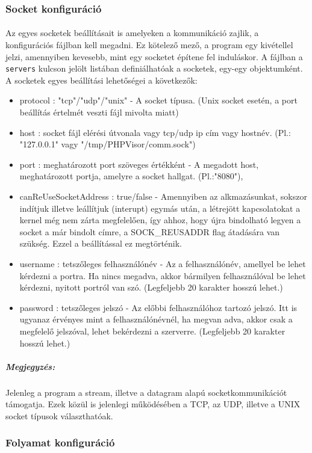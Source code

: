 \documentclass[12pt]{report}
\begin{document}
  \subsubsection{Socket konfiguráció}
  \paragraph{} 
  Az egyes socketek beállításait is amelyeken a kommunikáció zajlik, a konfigurációs fájlban kell megadni. Ez kötelező mező, a program egy kivétellel jelzi, amennyiben kevesebb, mint egy socketet építene fel induláskor. A fájlban a \verb|servers| kulcson jelölt listában definiálhatóak a socketek, egy-egy objektumként. A socketek egyes beállítási lehetőségei a következők:
  \begin{itemize}
  \item protocol : "tcp"/"udp"/"unix" - A socket típusa. (Unix socket esetén, a port beállítás értelmét veszti fájl mivolta miatt)
  \item host : socket fájl elérési útvonala vagy tcp/udp ip cím vagy hostnév. (Pl.: "127.0.0.1" vagy "/tmp/PHPVisor/comm.sock")
  \item port : meghatározott port szöveges értékként - A megadott host, meghatározott portja, amelyre a socket hallgat. (Pl.:"8080"),
  \item canReUseSocketAddress : true/false - Amennyiben az alkmazásunkat, sokszor indítjuk illetve leállítjuk (interupt) egymás után, a létrejött kapcsolatokat a kernel még nem zárta megfelelően, így ahhoz, hogy újra bindolható legyen a socket a már bindolt címre, a SOCK\_REUSADDR flag átadására van szükség. Ezzel a beállítással ez megtörténik.
  \item username : tetszőleges felhasználónév - Az a felhasználónév, amellyel be lehet kérdezni a portra. Ha nincs megadva, akkor bármilyen felhasználóval be lehet kérdezni, nyitott portról van szó. (Legfeljebb 20 karakter hosszú lehet.)
  \item password : tetszőleges jelszó - Az előbbi felhasználóhoz tartozó jelszó. Itt is ugyanaz érvényes mint a felhasználónévnél, ha megvan adva, akkor csak a megfelelő jelszóval, lehet bekérdezni a szerverre. (Legfeljebb 20 karakter hosszú lehet.)
  \end{itemize}
  \subparagraph{Megjegyzés:}
  Jelenleg a program a stream, illetve a datagram alapú socketkommunikációt támogatja. Ezek közül is jelenlegi működésében a TCP, az UDP, illetve a UNIX socket típusok választhatóak.
  \subsubsection{Folyamat konfiguráció}
\end{document}
